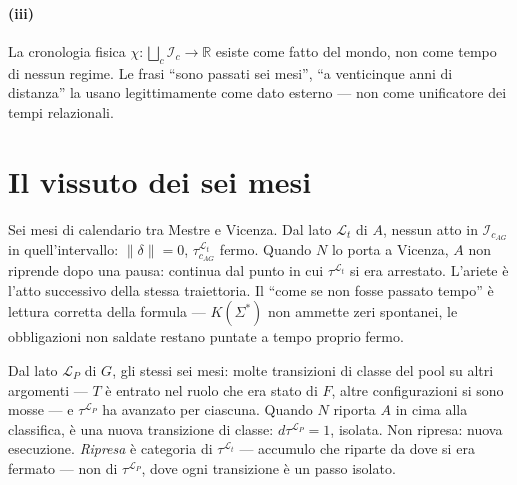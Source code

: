 \documentclass[
    oneside,                 %
    openany,                 %
    titlepage,
    11pt,
    a4paper,
    italian,
    DIV=14,                  %
    headinclude,
    footinclude=true,
    cleardoublepage=empty
]{scrbook}
\theoremstyle{ctplain}
\theoremstyle{ctdef}
\theoremstyle{ctrem}
\newcommand{\Lt}{\mathcal{L}_t}
\newcommand{\LP}{\mathcal{L}_P}
\newcommand{\KSigma}{K(\Sigma^{*})}
\begin{document}
\paragraph{(iii)} La cronologia fisica $\chi : \bigsqcup_c \mathcal{I}_c \to \mathbb{R}$ esiste come fatto del mondo, non come tempo di nessun regime. Le frasi ``sono passati sei mesi'', ``a venticinque anni di distanza'' la usano legittimamente come dato esterno --- non come unificatore dei tempi relazionali.

\section*{Il vissuto dei sei mesi}

Sei mesi di calendario tra Mestre e Vicenza. Dal lato $\Lt$ di $A$, nessun atto in $\mathcal{I}_{c_{AG}}$ in quell'intervallo: $\|\delta\| = 0$, $\tau^{\Lt}_{c_{AG}}$ fermo. Quando $N$ lo porta a Vicenza, $A$ non riprende dopo una pausa: continua dal punto in cui $\tau^{\Lt}$ si era arrestato. L'ariete è l'atto successivo della stessa traiettoria. Il ``come se non fosse passato tempo'' è lettura corretta della formula --- $\KSigma$ non ammette zeri spontanei, le obbligazioni non saldate restano puntate a tempo proprio fermo.

Dal lato $\LP$ di $G$, gli stessi sei mesi: molte transizioni di classe del pool su altri argomenti --- $T$ è entrato nel ruolo che era stato di $F$, altre configurazioni si sono mosse --- e $\tau^{\LP}$ ha avanzato per ciascuna. Quando $N$ riporta $A$ in cima alla classifica, è una nuova transizione di classe: $d\tau^{\LP} = 1$, isolata. Non ripresa: nuova esecuzione. \emph{Ripresa} è categoria di $\tau^{\Lt}$ --- accumulo che riparte da dove si era fermato --- non di $\tau^{\LP}$, dove ogni transizione è un passo isolato.
\end{document}
